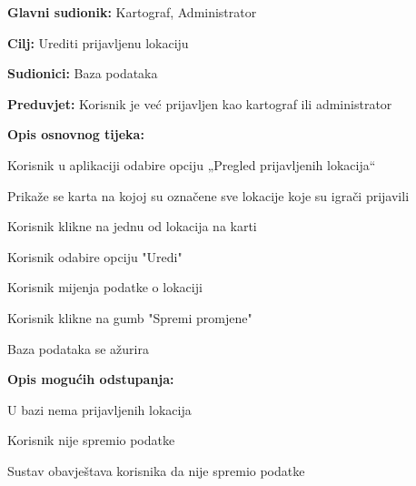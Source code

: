 \noindent {}
\begin{packed_item}
	
	\item \textbf{Glavni sudionik: }Kartograf, Administrator
	\item  \textbf{Cilj:} Urediti prijavljenu lokaciju
	\item  \textbf{Sudionici:} Baza podataka
	\item  \textbf{Preduvjet:} Korisnik je već prijavljen kao kartograf ili administrator
	\item  \textbf{Opis osnovnog tijeka:}
	
	\item[] \begin{packed_enum}
		
		\item Korisnik u aplikaciji odabire opciju „Pregled prijavljenih lokacija“
		\item Prikaže se karta na kojoj su označene sve lokacije koje su igrači prijavili
		\item Korisnik klikne na jednu od lokacija na karti
		\item Korisnik odabire opciju "Uredi"
		\item Korisnik mijenja podatke o lokaciji
		\item Korisnik klikne na gumb "Spremi promjene"
		\item Baza podataka se ažurira
	\end{packed_enum}
	
	\item  \textbf{Opis mogućih odstupanja:}
	
	\item[] \begin{packed_item}
		
		\item[3.a]  U bazi nema prijavljenih lokacija
		\item[5.a]  Korisnik nije spremio podatke
		\item[] \begin{packed_enum}
			
			\item Sustav obavještava korisnika da nije spremio podatke
			
		\end{packed_enum}
		
	\end{packed_item}
\end{packed_item}

